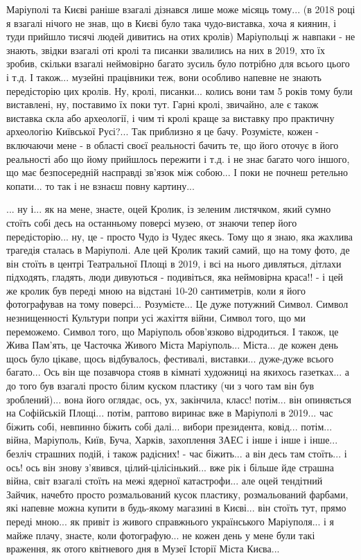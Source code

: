 Маріуполі та Києві раніше взагалі дізнався лише може місяць тому... (в 2018
році я взагалі нічого не знав, що в Києві було така чудо-виставка, хоча я
киянин, і туди прийшло тисячі людей дивитись на отих кролів) Маріупольці ж
навпаки - не знають, звідки взагалі оті кролі та писанки звалились на них в
2019, хто їх зробив, скільки взагалі неймовірно багато зусиль було потрібно для
всього цього і т.д. І також... музейні працівники теж, вони особливо напевне не
знають передісторію цих кролів. Ну, кролі, писанки... колись вони там 5 років
тому були виставлені, ну, поставимо їх поки тут. Гарні кролі, звичайно, але є
також виставка скла або археології, і чим ті кролі краще за виставку про
практичну археологію Київської Русі?... Так приблизно я це бачу. Розумієте,
кожен - включаючи мене - в області своєї реальності бачить те, що його оточує в
його реальності або що йому прийшлось пережити і т.д. і не знає багато чого
іншого, що має безпосередній насправді зв'язок між собою... І поки не почнеш
ретельно копати... то так і не взнаєш повну картину... 

... ну і... як на мене, знаєте, оцей Кролик, із зеленим листячком, який сумно
стоїть собі десь на останньому поверсі музею, от знаючи тепер його
передісторію... ну, це - просто Чудо із Чудес якесь. Тому що я знаю, яка
жахлива трагедія сталась в Маріуполі. Але цей Кролик такий самий, що на тому
фото, де він стоїть в центрі Театральної Площі в 2019, і всі на нього
дивляться, дітлахи підходять, гладять, люди дивуються - подивіться, яка
неймовірна краса!! - і цей же кролик був переді мною на відстані 10-20
сантиметрів, коли я його фотографував на тому поверсі... Розумієте... Це дуже
потужний Символ. Символ незнищенності Культури попри усі жахіття війни, Символ
того, що ми переможемо. Символ того, що Маріуполь обов'язково відродиться. І
також, це Жива Пам'ять, це Часточка Живого Міста Маріуполь... Міста... де кожен
день щось було цікаве, щось відбувалось, фестивалі, виставки... дуже-дуже
всього багато... Ось він ще позавчора стояв в кімнаті художниці на якихось
газетках... а до того був взагалі просто білим куском пластику (чи з чого там
він був зроблений)... вона його оглядає, ось, ух, закінчила, класс! потім...
він опиняється на Софійській Площі... потім, раптово виринає вже в Маріуполі в
2019... час біжить собі, невпинно біжить собі далі... вибори президента,
ковід... потім... війна, Маріуполь, Київ, Буча, Харків, захоплення ЗАЕС і інше
і інше і інше... безліч страшних подій, і також радісних! - час біжить... а він
десь там стоїть... і ось! ось він знову з'явився, цілий-цілісінький... вже рік
і більше йде страшна війна, світ взагалі стоїть на межі ядерної катастрофи...
але оцей тендітний Зайчик, начебто просто розмальований кусок пластику,
розмальований фарбами, які напевне можна купити в будь-якому магазині в
Києві... він стоїть тут, прямо переді мною... як привіт із живого справжнього
українського Маріуполя... і я майже плачу, знаєте, коли фотографую... не кожен
день у мене були такі враження, як отого квітневого дня в Музеї Історії Міста
Києва...

